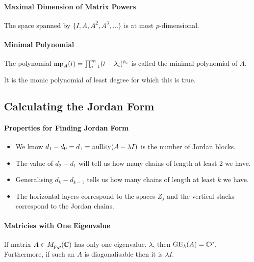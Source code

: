 \paragraph{Maximal Dimension of Matrix Powers}
The space spanned by \(\{I, A, A^2, A^3, \dots\}\) is at most \(p\)-dimensional.

\paragraph{Minimal Polynomial}
The polynomial \(\mathrm{mp}_A(t) = \prod_{i=1}^m (t - \lambda_i)^{h_i}\) is called the minimal polynomial of \(A\).

It is the monic polynomial of least degree for which this is true.

\subsection{Calculating the Jordan Form}
\paragraph{Properties for Finding Jordan Form}
\begin{itemize}
    \item We know \(d_1 - d_0 = d_1 = \mathrm{nullity}(A - \lambda I)\) is the number of Jordan blocks.
    \item The value of \(d_2 - d_1\) will tell us how many chains of length at least 2 we have.
    \item Generalising \(d_k - d_{k-1}\) tells us how many chains of length at least \(k\) we have.
    \item The horizontal layers correspond to the spaces \(Z_j\) and the vertical stacks correspond to the Jordan chains.
\end{itemize}

\paragraph{Matricies with One Eigenvalue}
If matrix \(A \in M_{p,p}(\mathbb{C})\) has only one eigenvalue, \(\lambda\), then
\(\operatorname{GE}_\lambda(A) = \mathbb{C}^p\). Furthermore, if such an \(A\) is diagonalisable then it is \(\lambda I\).